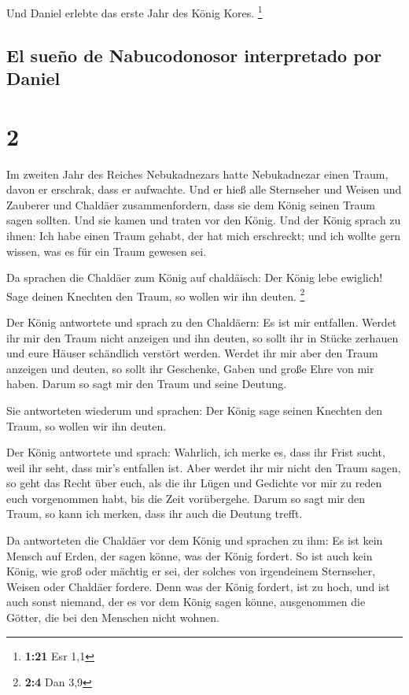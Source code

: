  Und Daniel erlebte das erste Jahr des König Kores.
\footnote{\textbf{1:21} Esr 1,1}

\hypertarget{el-sueuxf1o-de-nabucodonosor-interpretado-por-daniel}{%
\subsection{El sueño de Nabucodonosor interpretado por
Daniel}\label{el-sueuxf1o-de-nabucodonosor-interpretado-por-daniel}}

\hypertarget{section-1}{%
\section{2}\label{section-1}}

 Im zweiten Jahr des Reiches Nebukadnezars hatte
Nebukadnezar einen Traum, davon er erschrak, dass er aufwachte.
 Und er hieß alle Sternseher und Weisen und Zauberer und
Chaldäer zusammenfordern, dass sie dem König seinen Traum sagen sollten.
Und sie kamen und traten vor den König.  Und der König
sprach zu ihnen: Ich habe einen Traum gehabt, der hat mich erschreckt;
und ich wollte gern wissen, was es für ein Traum gewesen sei.

 Da sprachen die Chaldäer zum König auf chaldäisch: Der
König lebe ewiglich! Sage deinen Knechten den Traum, so wollen wir ihn
deuten. \footnote{\textbf{2:4} Dan 3,9}

 Der König antwortete und sprach zu den Chaldäern: Es ist
mir entfallen. Werdet ihr mir den Traum nicht anzeigen und ihn deuten,
so sollt ihr in Stücke zerhauen und eure Häuser schändlich verstört
werden.  Werdet ihr mir aber den Traum anzeigen und
deuten, so sollt ihr Geschenke, Gaben und große Ehre von mir haben.
Darum so sagt mir den Traum und seine Deutung.

 Sie antworteten wiederum und sprachen: Der König sage
seinen Knechten den Traum, so wollen wir ihn deuten.

 Der König antwortete und sprach: Wahrlich, ich merke es,
dass ihr Frist sucht, weil ihr seht, dass mir's entfallen ist.
 Aber werdet ihr mir nicht den Traum sagen, so geht das
Recht über euch, als die ihr Lügen und Gedichte vor mir zu reden euch
vorgenommen habt, bis die Zeit vorübergehe. Darum so sagt mir den Traum,
so kann ich merken, dass ihr auch die Deutung trefft.

 Da antworteten die Chaldäer vor dem König und sprachen
zu ihm: Es ist kein Mensch auf Erden, der sagen könne, was der König
fordert. So ist auch kein König, wie groß oder mächtig er sei, der
solches von irgendeinem Sternseher, Weisen oder Chaldäer fordere.
 Denn was der König fordert, ist zu hoch, und ist auch
sonst niemand, der es vor dem König sagen könne, ausgenommen die Götter,
die bei den Menschen nicht wohnen.

